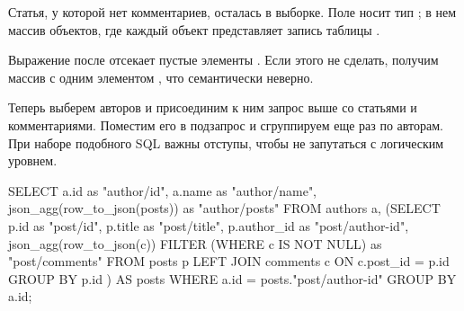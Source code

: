 

Статья, у которой нет комментариев, осталась в выборке. Поле  носит тип ; в нем массив объектов, где каждый объект представляет запись таблицы .

Выражение  после  отсекает пустые элементы . Если этого не сделать, получим массив с одним элементом , что семантически неверно.

Теперь выберем авторов и присоединим к ним запрос выше со статьями и комментариями. Поместим его в подзапрос и сгруппируем еще раз по авторам. При наборе подобного SQL важны отступы, чтобы не запутаться с логическим уровнем.

\begin{english}
  \begin{sql}
SELECT
  a.id                         as "author/id",
  a.name                       as "author/name",
  json_agg(row_to_json(posts)) as "author/posts"
FROM
  authors a,
  (SELECT
    p.id        as "post/id",
    p.title     as "post/title",
    p.author_id as "post/author-id",
    json_agg(row_to_json(c)) FILTER
            (WHERE c IS NOT NULL) as "post/comments"
  FROM posts p
  LEFT JOIN comments c ON c.post_id = p.id
  GROUP BY p.id
) AS posts
WHERE a.id = posts."post/author-id"
GROUP BY a.id;
  \end{sql}
\end{english}

